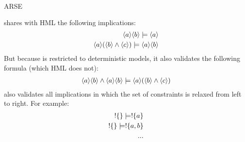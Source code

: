 ARSE
\begin{example}
\ELABR{} shares with HML the following implications:
\begin{eqnarray*}
\langle a \rangle \langle b \rangle \models \langle a \rangle \\
\langle a \rangle (\langle b \rangle \land \langle c \rangle ) \models \langle a \rangle \langle b \rangle \end{eqnarray*}
But because \ELABR{} is restricted to deterministic models, it also validates the following formula (which HML does not):
\begin{eqnarray*}
\langle a \rangle \langle b \rangle \land \langle a \rangle \langle b \rangle \models \langle a \rangle (\langle b \rangle \land \langle c \rangle )
\end{eqnarray*}
\ELABR{} also validates all implications in which the set of constraints is relaxed from left to right. For example:
\begin{eqnarray*}
! \{\} \models ! \{a\} \\
! \{\} \models ! \{a, b\} \\
...
\end{eqnarray*}
\end{example}
